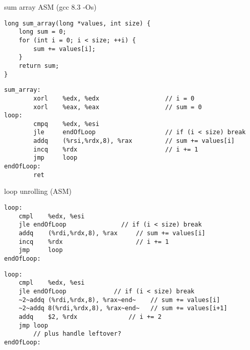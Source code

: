\begin{frame}[fragile,label=loopUnrollAsmSetup]{sum array ASM (gcc 8.3 -Os)}
\begin{lstlisting}
long sum_array(long *values, int size) {
    long sum = 0;
    for (int i = 0; i < size; ++i) {
        sum += values[i];
    }
    return sum;
}
\end{lstlisting}
    \vspace{-.25cm}
\begin{lstlisting}
sum_array:
        xorl    %edx, %edx                  // i = 0
        xorl    %eax, %eax                  // sum = 0
loop:
        cmpq    %edx, %esi                  
        jle     endOfLoop                   // if (i < size) break
        addq    (%rsi,%rdx,8), %rax         // sum += values[i]
        incq    %rdx                        // i += 1
        jmp     loop
endOfLoop:
        ret
\end{lstlisting}
\end{frame}


\begin{frame}[fragile,label=loopUnrollAsm]{loop unrolling (ASM)}
    \vspace{-.25cm}
\begin{lstlisting}
loop:
	cmpl	%edx, %esi 
	jle	endOfLoop               // if (i < size) break
	addq	(%rdi,%rdx,8), %rax     // sum += values[i]
	incq    %rdx                    // i += 1
	jmp     loop
endOfLoop:
\end{lstlisting}

    \vspace{-.4cm}
\hrulefill
\begin{lstlisting}
loop:
	cmpl	%edx, %esi
	jle	endOfLoop             // if (i < size) break
	~2~addq	(%rdi,%rdx,8), %rax~end~    // sum += values[i]
	~2~addq	8(%rdi,%rdx,8), %rax~end~   // sum += values[i+1]
	addq    $2, %rdx              // i += 2
	jmp	loop
        // plus handle leftover?
endOfLoop:
\end{lstlisting}
\end{frame}


